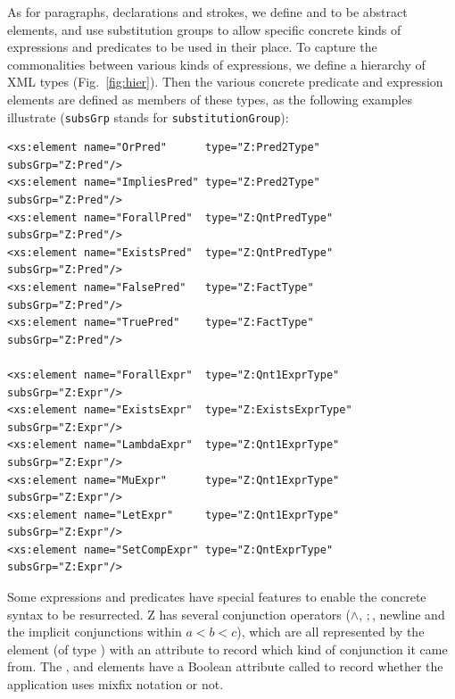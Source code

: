 \documentclass{llncs}  %
\begin{document}
As for paragraphs, declarations and strokes, we define 
and  to be abstract elements, and use substitution
groups to allow specific concrete kinds of expressions and predicates to be
used in their place.  To capture the commonalities between various 
kinds of expressions, we define a hierarchy of XML types
(Fig.~\ref{fig:hier}).   Then the various concrete predicate and
expression elements are defined as members of these types, as the
following examples illustrate (\verb!subsGrp! stands for
\verb!substitutionGroup!):
\begin{small}
\begin{verbatim}
<xs:element name="OrPred"      type="Z:Pred2Type"      subsGrp="Z:Pred"/>
<xs:element name="ImpliesPred" type="Z:Pred2Type"      subsGrp="Z:Pred"/>
<xs:element name="ForallPred"  type="Z:QntPredType"    subsGrp="Z:Pred"/>
<xs:element name="ExistsPred"  type="Z:QntPredType"    subsGrp="Z:Pred"/>
<xs:element name="FalsePred"   type="Z:FactType"       subsGrp="Z:Pred"/>
<xs:element name="TruePred"    type="Z:FactType"       subsGrp="Z:Pred"/>

<xs:element name="ForallExpr"  type="Z:Qnt1ExprType"   subsGrp="Z:Expr"/>
<xs:element name="ExistsExpr"  type="Z:ExistsExprType" subsGrp="Z:Expr"/>
<xs:element name="LambdaExpr"  type="Z:Qnt1ExprType"   subsGrp="Z:Expr"/>
<xs:element name="MuExpr"      type="Z:Qnt1ExprType"   subsGrp="Z:Expr"/>
<xs:element name="LetExpr"     type="Z:Qnt1ExprType"   subsGrp="Z:Expr"/>
<xs:element name="SetCompExpr" type="Z:QntExprType"    subsGrp="Z:Expr"/>
\end{verbatim}
\end{small}

Some expressions and predicates have special features to enable the
concrete syntax to be resurrected.  Z has several
conjunction operators ($\land$, $;$, newline and the implicit conjunctions
within $a < b < c$), which are all represented by the 
element (of type ) with an attribute to record which
kind of conjunction it came from.  The , 
and  elements have a Boolean attribute called 
to record whether the application uses mixfix notation or not.
\end{document}
